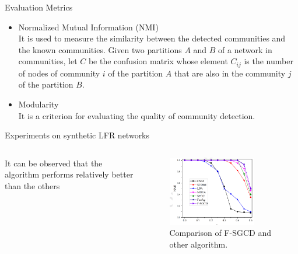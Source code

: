 \documentclass[aspectratio=169,xcolor=dvipsnames]{beamer}
\begin{document}

\begin{frame}{Evaluation Metrics}
    \begin{itemize}
        \item Normalized Mutual Information (NMI) \\
        It is used to measure the similarity between the detected communities and the known communities. Given two partitions $A$ and $B$ of a network in communities, let $C$ be the confusion matrix whose element $C_{ij}$ is the number of nodes of community $i$ of the partition $A$ that are also in the community $j$ of the partition $B$.
        \item Modularity \\
        It is a criterion for evaluating the quality of community detection.
    \end{itemize}
\end{frame}


\begin{frame}{Experiments on synthetic LFR networks}
    \begin{columns}
        \begin{column}{0.5\textwidth}
                It can be observed that the algorithm performs relatively better than the others
        \end{column}
        \begin{column}{0.5\textwidth}
            \begin{figure}
            \centering
                \includegraphics[width=0.8\textwidth]{synthetic-LFR.PNG}
                \caption{Comparison of F-SGCD and other algorithm.}
            \end{figure}
        \end{column}
    \end{columns}
\end{frame}
\end{document}
